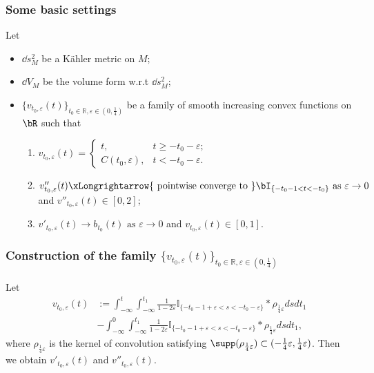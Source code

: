 \subsubsection{Some basic settings}
Let 
\begin{itemize}
  \item $\dd s_M^2$ be a K\"ahler metric on $M$;
  \item $\dd V_M$ be the volume form w.r.t $\dd s_M^2$;
  \item $\{v_{t_0,\varepsilon}(t)\}_{t_0\in\mathbb{R},\varepsilon\in (0,\frac 14)}$ be a family of smooth increasing convex functions on $\bR$ such that 
  \begin{enumerate}[label=(\arabic*)]
    \item $v_{t_0,\varepsilon}(t)=\begin{cases}
      t, & t\geqslant -t_0-\varepsilon;\\ 
      C(t_0,\varepsilon), & t<-t_0-\varepsilon.
    \end{cases}$
    \item $v''_{t_0,\varepsilon}(t)\xLongrightarrow{\text{ pointwise converge to }} \bI_{\{-t_0-1<t<-t_0\}} \text{ as } \varepsilon\to 0$ and $v''_{t_0,\varepsilon}(t)\in [0,2]$;
    \item $v'_{t_0,\varepsilon}(t)\to b_{t_0}(t) \text{ as } \varepsilon\to 0$ and $v_{t_0,\varepsilon}(t)\in [0,1]$.
  \end{enumerate}
\end{itemize}
\subsubsection{Construction of the family \texorpdfstring{$\{v_{t_0,\varepsilon}(t)\}_{t_0\in\mathbb{R},\varepsilon\in (0,\frac 14)}$ }{}}
Let 
\begin{equation}
  \label{}
  \begin{split}
  v_{t_0,\varepsilon}(t)&:=\int_{-\infty}^{t}\int_{-\infty}^{t_{1}}\frac{1}
  {1-2\varepsilon}\mathbb{I}_{\{-t_{0}-1+\varepsilon< s<-t_{0}-\varepsilon\}}
  *\rho_{\frac{1}{4}\varepsilon}dsdt_{1}
  \\&-\int_{-\infty}^{0}\int_{-\infty}^{t_{1}}\frac{1}{1-2\varepsilon}
  \mathbb{I}_{\{-t_{0}-1+\varepsilon< s<-t_{0}-\varepsilon\}}*\rho_{\frac{1}{4}\varepsilon}dsdt_{1},
  \end{split}
  \end{equation}
  where $\rho_{\frac{1}{4}\varepsilon}$ is the kernel of convolution satisfying $\supp(\rho_{\frac{1}{4}\varepsilon})
  \subset (-\frac{1}{4}\varepsilon,\frac{1}{4}\varepsilon)$.
Then we obtain $v'_{t_0,\varepsilon}(t)$ and $v''_{t_0,\varepsilon}(t)$.
